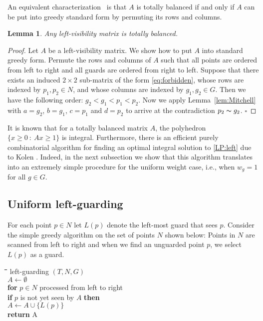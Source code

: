 \documentclass[11pt]{article}
\newenvironment{code}{\noindent \begin{tabbing}\hspace{1em}\=\hspace{1em}\=\hspace{1em}\=\hspace{1em}\=\hspace{1em}\=\hspace{1em}\=\hspace{1em}\=\hspace{1em}\=\hspace{1em}\=\hspace{1em}\=\kill}{\end{tabbing}}
\newcommand{\sees}{\thicksim}
\newcommand{\qed}{\hfill$\square$\bigskip}
\newtheorem{lemma}{Lemma}
\begin{document}
An equivalent characterization~\cite{journal/SIADM/HoffmanKS85} is that $A$ is
totally balanced if and only if $A$ can be put into greedy standard form by
permuting its rows and columns.

\begin{lemma} \label{lem:split}
  Any left-visibility matrix is totally balanced.
\end{lemma}

\begin{proof}
  Let $A$ be a left-visibility matrix. We show how to put $A$ into standard
  greedy form. Permute the rows and columns of $A$ such that all points are
  ordered from left to right and all guards are ordered from right to
  left. Suppose that there exists an induced $2\times 2$ sub-matrix of the
  form \eqref{eq:forbidden}, whose rows are indexed by $p_1,p_2\in N$, and
  whose columns are indexed by $g_1,g_2\in G$. Then we have the following
  order: $g_2<g_1<p_1<p_2$. Now we apply Lemma~\ref{lem:Mitchell}
  with $a=g_2$, $b=g_1$, $c=p_1$ and $d=p_2$ to arrive at the
  contradiction $p_2\sees g_2$. \qed
\end{proof}

It is known that for a totally balanced matrix $A$, the
polyhedron $\{x\geq 0~:~Ax\geq 1\}$ is integral. Furthermore, there is an
efficient purely combinatorial algorithm for finding an optimal integral
solution to \eqref{LP:left} due to Kolen \cite{thesis/Kolen82}. Indeed, in the
next subsection we show that this algorithm translates into an extremely
simple procedure for the uniform weight case, i.e., when $w_g = 1$ for all $g
\in G$.

\subsection{Uniform left-guarding}

For each point $p\in N$ let $L(p)$ denote the left-most guard that
sees $p$. Consider the simple greedy algorithm on the set of points $N$ shown
below: Points in $N$ are scanned from left to right
and when we find an unguarded point $p$, we select $L(p)$ as a guard.

\begin{center}
  \begin{minipage}{5em}
    \begin{code}
      {\sc left-guarding} $(T,N,G)$ \\
      $A \leftarrow \emptyset$ \\
      {\bf for} $p\in N$ processed from left to right \\
      \>  {\bf if} $p$ is not yet seen by $A$ {\bf then} \\
      \> \> $A \leftarrow A \cup \{L(p)\}$ \\
      {\bf return} A
    \end{code}
  \end{minipage}
\end{center}
\end{document}
